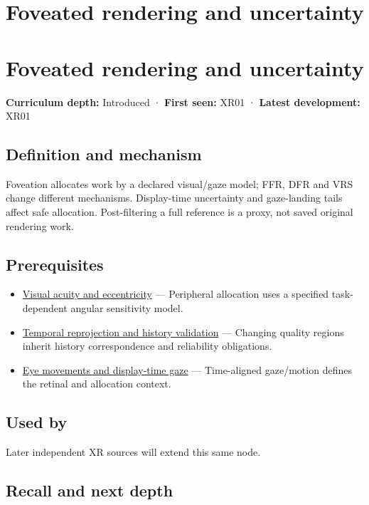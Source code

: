 \hypertarget{appendix-5878b813b732}{}
\section*{Foveated rendering and uncertainty}
\section{Foveated rendering and uncertainty}\label{foveated-rendering-and-uncertainty}

\textbf{Curriculum depth:} Introduced · \textbf{First seen:} XR01 · \textbf{Latest development:} XR01

\subsection{Definition and mechanism}\label{definition-and-mechanism}

Foveation allocates work by a declared visual/gaze model; FFR, DFR and VRS change different mechanisms. Display-time uncertainty and gaze-landing tails affect safe allocation. Post-filtering a full reference is a proxy, not saved original rendering work.

\subsection{Prerequisites}\label{prerequisites}

\begin{itemize}
\tightlist
\item
  \hyperref[appendix-b491fc48c54b]{Visual acuity and eccentricity} --- Peripheral allocation uses a specified task-dependent angular sensitivity model.
\item
  \hyperref[appendix-0727340a4428]{Temporal reprojection and history validation} --- Changing quality regions inherit history correspondence and reliability obligations.
\item
  \hyperref[appendix-a6f2c4fe1996]{Eye movements and display-time gaze} --- Time-aligned gaze/motion defines the retinal and allocation context.
\end{itemize}

\subsection{Used by}\label{used-by}

Later independent XR sources will extend this same node.

\subsection{Recall and next depth}\label{recall-and-next-depth}

